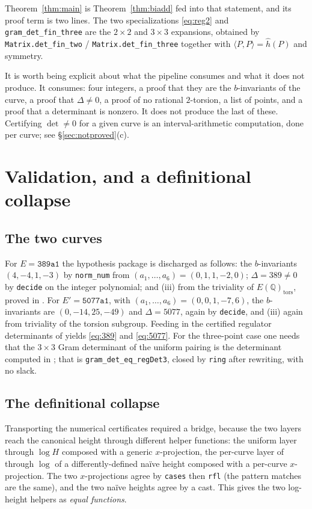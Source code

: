 \documentclass[11pt,reqno]{amsart}
\theoremstyle{plain}
\theoremstyle{definition}
\theoremstyle{remark}
\DeclareRobustCommand{\lt}[1]{\texttt{#1}}
\newcommand{\hh}{\widehat{h}}
\newcommand{\nh}{H}
\begin{document}
Theorem~\ref{thm:main} is Theorem~\ref{thm:biadd} fed into that
statement, and its proof term is two lines. The two specializations
\eqref{eq:reg2} and \lt{gram\_det\_fin\_three} are the $2\times2$ and
$3\times3$ expansions, obtained by \lt{Matrix.det\_fin\_two} /
\lt{Matrix.det\_fin\_three} together with
$\langle P,P\rangle = \hh(P)$ and symmetry.

It is worth being explicit about what the pipeline consumes and what it
does not produce. It consumes: four integers, a proof that they are the
$b$-invariants of the curve, a proof that $\Delta \ne 0$, a proof of no
rational $2$-torsion, a list of points, and a proof that a determinant
is nonzero. It does not produce the last of these. Certifying
$\det \ne 0$ for a given curve is an interval-arithmetic computation,
done per curve; see \S\ref{sec:notproved}(c).

\section{Validation, and a definitional collapse}\label{sec:validation}

\subsection{The two curves}

For $E = \mathtt{389a1}$ the hypothesis package is discharged as
follows: the $b$-invariants $(4,-4,1,-3)$ by \lt{norm\_num} from
$(a_1,\dots,a_6) = (0,1,1,-2,0)$; $\Delta = 389 \ne 0$ by \lt{decide} on
the integer polynomial; and (iii) from the triviality of
$E(\mathbb{Q})_{\mathrm{tors}}$, proved in \cite{MW}. For
$E' = \mathtt{5077a1}$, with $(a_1,\dots,a_6) = (0,0,1,-7,6)$, the
$b$-invariants are $(0,-14,25,-49)$ and $\Delta = 5077$, again by
\lt{decide}, and (iii) again from triviality of the torsion subgroup.
Feeding in the certified regulator determinants of \cite{MW} yields
\eqref{eq:389} and \eqref{eq:5077}. For the three-point case one needs
that the $3\times3$ Gram determinant of the uniform pairing is the
determinant computed in \cite{MW}; that is
\lt{gram\_det\_eq\_regDet3}, closed by \lt{ring} after rewriting, with
no slack.

\subsection{The definitional collapse}

Transporting the numerical certificates required a bridge, because the
two layers reach the canonical height through different helper
functions: the uniform layer through
$\log\nh$ composed with a generic $x$-projection, the per-curve layer of
\cite{MW} through $\log$ of a differently-defined na\"ive height
composed with a per-curve $x$-projection. The two $x$-projections agree
by \lt{cases} then \lt{rfl} (the pattern matches are the same), and the
two na\"ive heights agree by a cast. This gives the two log-height
helpers as \emph{equal functions}.
\end{document}
